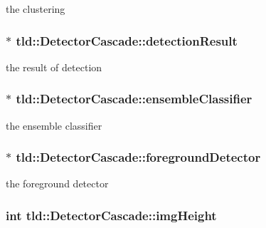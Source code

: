 the clustering 

\hypertarget{classtld_1_1DetectorCascade_a14544e4e2e7ca365e49969a6937aec51}{
\subsubsection[{detection\-Result}]{$\ast$ tld\-::\-Detector\-Cascade\-::detection\-Result}}\label{classtld_1_1DetectorCascade_a14544e4e2e7ca365e49969a6937aec51}


the result of detection 

\hypertarget{classtld_1_1DetectorCascade_a818a0be0ff9f76fb42534a056761c163}{
\subsubsection[{ensemble\-Classifier}]{$\ast$ tld\-::\-Detector\-Cascade\-::ensemble\-Classifier}}\label{classtld_1_1DetectorCascade_a818a0be0ff9f76fb42534a056761c163}


the ensemble classifier 

\hypertarget{classtld_1_1DetectorCascade_ad03faad5b05805f5edba330cccfee1f1}{
\subsubsection[{foreground\-Detector}]{$\ast$ tld\-::\-Detector\-Cascade\-::foreground\-Detector}}\label{classtld_1_1DetectorCascade_ad03faad5b05805f5edba330cccfee1f1}


the foreground detector 

\hypertarget{classtld_1_1DetectorCascade_a4e9b954d0b95f6e91d479bba9ec6beac}{
\subsubsection[{img\-Height}]{\setlength{\rightskip}{0pt plus 5cm}int tld\-::\-Detector\-Cascade\-::img\-Height}}\label{classtld_1_1DetectorCascade_a4e9b954d0b95f6e91d479bba9ec6beac}



